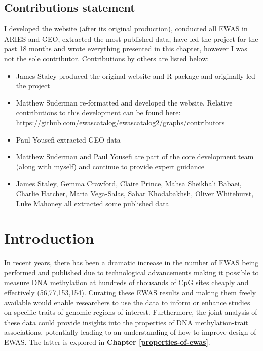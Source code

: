 \documentclass[11pt,twoside]{bristolthesis}
\providecommand{\tightlist}{%
  \setlength{\itemsep}{0pt}\setlength{\parskip}{0pt}}
\begin{document}
\hypertarget{contributions-statement-03}{%
\subsection{Contributions statement}\label{contributions-statement-03}}

I developed the website (after its original production), conducted all EWAS in ARIES and GEO, extracted the most published data, have led the project for the past 18 months and wrote everything presented in this chapter, however I was not the sole contributor. Contributions by others are listed below:
\begin{itemize}
\tightlist
\item
  James Staley produced the original website and R package and originally led the project
\item
  Matthew Suderman re-formatted and developed the website. Relative contributions to this development can be found here: \url{https://github.com/ewascatalog/ewascatalog2/graphs/contributors}
\item
  Paul Yousefi extracted GEO data
\item
  Matthew Suderman and Paul Yousefi are part of the core development team (along with myself) and continue to provide expert guidance
\item
  James Staley, Gemma Crawford, Claire Prince, Mahsa Sheikhali Babaei, Charlie Hatcher, Maria Vega-Salas, Sahar Khodabakhsh, Oliver Whitehurst, Luke Mahoney all extracted some published data
\end{itemize}
\hypertarget{introduction-03}{%
\section{Introduction}\label{introduction-03}}

In recent years, there has been a dramatic increase in the number of EWAS being performed and published due to technological advancements making it possible to measure DNA methylation at hundreds of thousands of CpG sites cheaply and effectively (56,77,153,154). Curating these EWAS results and making them freely available would enable researchers to use the data to inform or enhance studies on specific traits of genomic regions of interest. Furthermore, the joint analysis of these data could provide insights into the properties of DNA methylation-trait associations, potentially leading to an understanding of how to improve design of EWAS. The latter is explored in \textbf{Chapter \ref{properties-of-ewas}}.
\end{document}
